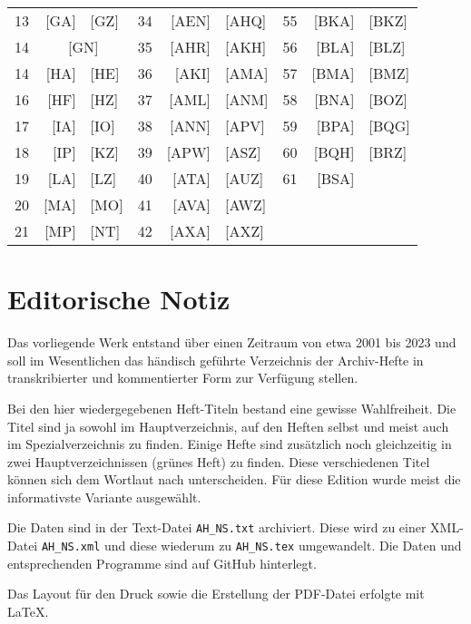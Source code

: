 \documentclass[a4paper]{scrbook}
\begin{document}
\begin{table}[ht]
\begin{tabular}{rr@{ -- }lrr@{ -- }lrr@{ -- }l}
13 & {[}GA{]}&{[}GZ{]}            & 34 & {[}AEN{]}&{[}AHQ{]} & 55 & {[}BKA{]}&{[}BKZ{]} \\
14 & \multicolumn{2}{c}{{[}GN{]}} & 35 & {[}AHR{]}&{[}AKH{]} & 56 & {[}BLA{]}&{[}BLZ{]} \\
14 & {[}HA{]}&{[}HE{]}            & 36 & {[}AKI{]}&{[}AMA{]} & 57 & {[}BMA{]}&{[}BMZ{]} \\
16 & {[}HF{]}&{[}HZ{]}            & 37 & {[}AML{]}&{[}ANM{]} & 58 & {[}BNA{]}&{[}BOZ{]} \\
17 & {[}IA{]}&{[}IO{]}            & 38 & {[}ANN{]}&{[}APV{]} & 59 & {[}BPA{]}&{[}BQG{]} \\
18 & {[}IP{]}&{[}KZ{]}            & 39 & {[}APW{]}&{[}ASZ{]} & 60 & {[}BQH{]}&{[}BRZ{]} \\
19 & {[}LA{]}&{[}LZ{]}            & 40 & {[}ATA{]}&{[}AUZ{]} & 61 & {[}BSA{]}&          \\
20 & {[}MA{]}&{[}MO{]}            & 41 & {[}AVA{]}&{[}AWZ{]} & \multicolumn{2}{c}{} \\
21 & {[}MP{]}&{[}NT{]}            & 42 & {[}AXA{]}&{[}AXZ{]} & \multicolumn{2}{c}{}&       
\end{tabular}
\end{table}




\chapter{Editorische Notiz}
Das vorliegende Werk entstand über einen Zeitraum von etwa 2001 bis 2023 und soll im Wesentlichen das händisch geführte Verzeichnis der Archiv-Hefte in transkribierter und kommentierter Form zur Verfügung stellen.

Bei den hier wiedergegebenen Heft-Titeln bestand eine gewisse Wahlfreiheit. Die Titel sind ja sowohl im Hauptverzeichnis, auf den Heften selbst und meist auch im Spezialverzeichnis zu finden. Einige Hefte sind zusätzlich noch gleichzeitig in zwei Hauptverzeichnissen (\glqq{}grünes Heft\grqq{}) zu finden. Diese verschiedenen Titel können sich dem Wortlaut nach unterscheiden. Für diese Edition wurde meist die informativste Variante ausgewählt.

Die Daten sind in der Text-Datei \texttt{AH\_NS.txt} archiviert. Diese wird zu einer XML-Datei \texttt{AH\_NS.xml} und diese wiederum zu \texttt{AH\_NS.tex} umgewandelt. Die Daten und entsprechenden Programme sind auf GitHub hinterlegt.

Das Layout für den Druck sowie die Erstellung der PDF-Datei erfolgte mit \LaTeX.
\end{document}
